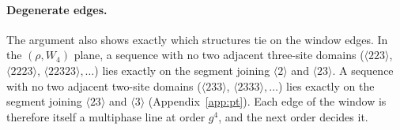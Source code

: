 \paragraph*{Degenerate edges.}
The argument also shows exactly which structures tie on the window edges. In the $(\rho,W_4)$ plane, a
sequence with no two adjacent three-site domains ($\langle223\rangle$, $\langle2223\rangle$,
$\langle22323\rangle,\dots$) lies exactly on the segment joining $\langle2\rangle$ and $\langle23\rangle$. A
sequence with no two adjacent two-site domains ($\langle233\rangle$, $\langle2333\rangle,\dots$) lies exactly on
the segment joining $\langle23\rangle$ and $\langle3\rangle$ (Appendix~\ref{app:pt}).
Each edge of the window is therefore itself a multiphase line at order $g^4$, and the next order decides it.

